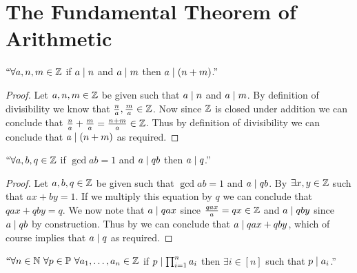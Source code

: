     \section{The Fundamental Theorem of Arithmetic}
        \begin{lemma}
            $``\forall a, n, m \in \mathbb{Z}$ if $a \mid n$ and $a \mid m$ then
            $a \mid (n + m)$.''
            \label{FTA lemma 1}
        \end{lemma}
        \begin{proof}
            Let $a, n, m \in \mathbb{Z}$ be given such that $a \mid n$ and $a \mid m$.
            By definition of divisibility we know that $\frac{n}{a}, \frac{m}{a} \in \mathbb{Z}$.
            Now since $\mathbb{Z}$ is closed under addition we can conclude that 
            $\frac{n}{a} + \frac{m}{a} = \frac{n + m}{a} \in \mathbb{Z}$. Thus by definition of
            divisibility we can conclude that $a \mid (n + m)$ as required.
            \QED
        \end{proof}
        \begin{lemma}
            $``\forall a, b, q \in \mathbb{Z}$ if $\gcd{a}{b} = 1$ and $a \mid qb$ then
            $a \mid q$.''
            \label{FTA lemma 2}
        \end{lemma}
        \begin{proof}
            Let $a, b, q \in \mathbb{Z}$ be given such that $\gcd{a}{b} = 1$ and $a \mid qb$.
            By  $\exists x, y \in \mathbb{Z}$ such that
            $ax + by = 1$. If we multiply this equation by $q$ we can conclude that
            $qax + qby = q$. We now note that $a \mid qax$ since $\frac{qax}{a} = qx \in \mathbb{Z}$
            and $a \mid qby$ since $a \mid qb$ by construction. Thus by
             we can conclude that $a \mid qax + qby$, which of course
            implies that $a \mid q$ as required. \QED
        \end{proof}
        \begin{lemma}
            $``\forall n \in \mathbb{N} \ \forall p \in \mathbb{P} \ \forall a_1, \dots, a_n \in \mathbb{Z}$
            if $p \mid \prod_{i = 1}^{n} a_i$ then $\exists i \in [n]$ such that $p \mid a_i$.''
            \label{FTA Lemma 3}
        \end{lemma}
